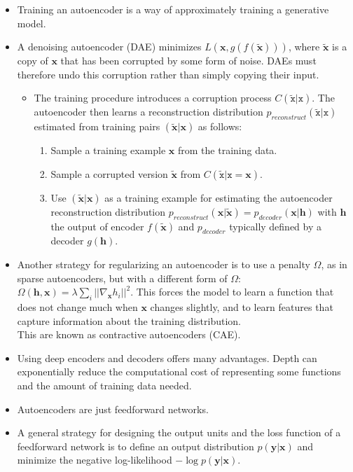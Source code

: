 \documentclass{article}
\begin{document}
\begin{itemize}
\item Training an autoencoder is a way of approximately training a generative model.
\item A denoising autoencoder (DAE) minimizes \(L(\boldsymbol{x},g(f(\boldsymbol{\tilde{x}})))\), where \(\boldsymbol{\tilde{x}}\) is a copy of \(\boldsymbol{x}\) that has been corrupted by some form of noise. DAEs must therefore undo this corruption rather than simply copying their input.
\begin{itemize}
\item The training procedure introduces a corruption process \(C(\mathtt{\tilde{x}}|\mathtt{x})\). The autoencoder then learns a reconstruction distribution \(p_{reconstruct}(\mathtt{\tilde{x}}|\mathtt{x})\) estimated from training pairs \((\boldsymbol{\tilde{x}}|\boldsymbol{x})\) as follows:
\begin{enumerate}
\item Sample a training example \(\boldsymbol{x}\) from the training data.
\item Sample a corrupted version \(\boldsymbol{\tilde{x}}\) from \(C(\mathtt{\tilde{x}}|\mathtt{x}=\boldsymbol{x})\).
\item Use \((\boldsymbol{\tilde{x}}|\boldsymbol{x})\) as a training example for estimating the autoencoder reconstruction distribution \(p_{reconstruct}(\boldsymbol{x}|\boldsymbol{\tilde{x}})=p_{decoder}(\boldsymbol{x}|\boldsymbol{h})\) with \(\boldsymbol{h}\) the output of encoder \(f(\boldsymbol{\tilde{x}})\) and \(p_{decoder}\) typically defined by a decoder \(g(\boldsymbol{h})\).
\end{enumerate}
\end{itemize}
\item Another strategy for regularizing an autoencoder is to use a penalty \(\Omega\), as in sparse autoencoders, but with a different form of \(\Omega\): \(\Omega(\boldsymbol{h},\boldsymbol{x}) = \lambda\sum_i||\nabla_{\boldsymbol{x}}h_i||^2\). This forces the model to learn a function that does not change much when \(\boldsymbol{x}\) changes slightly, and to learn features that capture information about the training distribution.\\This are known as contractive autoencoders (CAE).
\item Using deep encoders and decoders offers many advantages. Depth can exponentially reduce the computational cost of representing some functions and the amount of training data needed.
\item Autoencoders are just feedforward networks.
\item A general strategy for designing the output units and the loss function of a feedforward network is to define an output distribution \(p(\boldsymbol{y}|\boldsymbol{x})\) and minimize the negative log-likelihood \(-\log p(\boldsymbol{y}|\boldsymbol{x})\).

\end{itemize}
\end{document}
